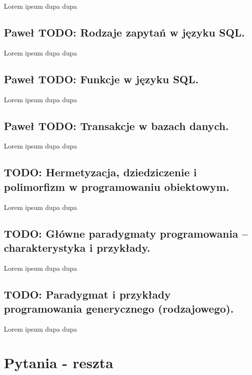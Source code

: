 \documentclass[a4paper,12pt,oneside]{book}
\begin{document}
				Lorem ipsum dupa dupa
		
		\setcounter{section}{35}
		\section{\color{green}Paweł \color{red} TODO: Rodzaje zapytań w języku SQL. }
				
				Lorem ipsum dupa dupa
		
		\setcounter{section}{36}
		\section{\color{green}Paweł \color{red} TODO: Funkcje w języku SQL. }
				
				Lorem ipsum dupa dupa
		
		\setcounter{section}{37}
		\section{\color{green}Paweł \color{red} TODO: Transakcje w bazach danych.} 
				
				Lorem ipsum dupa dupa
		
		
		\setcounter{section}{14}
		\section{\color{red} TODO: Hermetyzacja, dziedziczenie i polimorfizm w programowaniu obiektowym. }
				
				Lorem ipsum dupa dupa
				
		\setcounter{section}{47}
		\section{\color{red} TODO: Główne paradygmaty programowania – charakterystyka i przykłady. }
						
				Lorem ipsum dupa dupa
				
		\setcounter{section}{16}
		\section{\color{red} TODO: Paradygmat i przykłady programowania generycznego (rodzajowego). }
								
						Lorem ipsum dupa dupa
	
	\chapter{Pytania - reszta}
		
\end{document}
